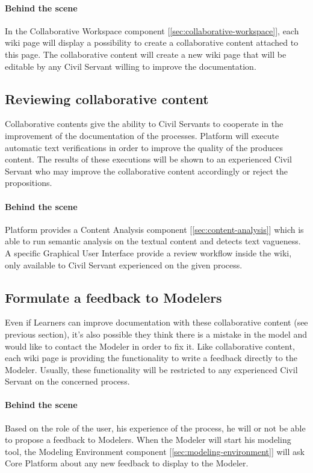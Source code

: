 \documentclass{learnpad}
\begin{document}
\paragraph{Behind the scene}
In the Collaborative Workspace component [\ref{sec:collaborative-workspace}],
each wiki page will display a possibility to create a collaborative content
attached to this page.  The collaborative content will create a new wiki page
that will be editable by any Civil Servant willing to improve the documentation.

\subsection{Reviewing collaborative content}
Collaborative contents give the ability to Civil Servants to cooperate in the
improvement of the documentation of the processes.  \learnpad Platform will
execute automatic text verifications in order to improve the quality of the
produces content.  The results of these executions will be shown to an
experienced Civil Servant who may improve the collaborative content accordingly
or reject the propositions.

\paragraph{Behind the scene}
\learnpad Platform provides a Content Analysis component
[\ref{sec:content-analysis}] which is able to run semantic analysis on the
textual content and detects text vagueness.  A specific Graphical User Interface
provide a review workflow inside the wiki, only available to Civil Servant
experienced on the given process.

\subsection{Formulate a feedback to Modelers}\label{sse:FormulateFeedbackToModeler}
Even if Learners can improve documentation with these collaborative content (see
previous section), it's also possible they think there is a mistake in the model
and would like to contact the Modeler in order to fix it.  Like collaborative
content, each wiki page is providing the functionality to write a feedback
directly to the Modeler.  Usually, these functionality will be restricted to any
experienced Civil Servant on the concerned process.

\paragraph{Behind the scene}
Based on the role of the user, his experience of the process, he will or not be
able to propose a feedback to Modelers.  When the Modeler will start his
modeling tool, the Modeling Environment component
[\ref{sec:modeling-environment}] will ask \learnpad Core Platform about any new
feedback to display to the Modeler.
\end{document}
